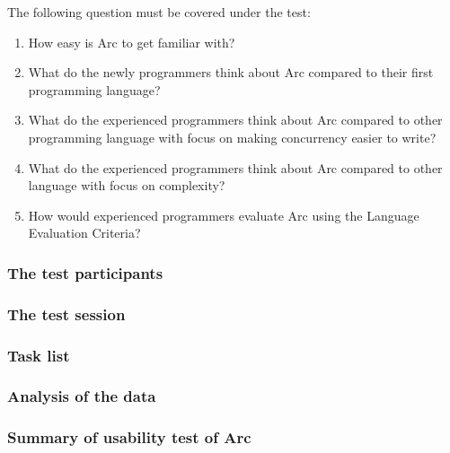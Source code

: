 The following question must be covered under the test:
\begin{enumerate}
    \item How easy is Arc to get familiar with?
    \item What do the newly programmers think about Arc compared to their first programming language?
    \item What do the experienced programmers think about Arc compared to other programming language with focus on making concurrency easier to write?
    \item What do the experienced programmers think about Arc compared to other language with focus on complexity?
    \item How would experienced programmers evaluate Arc using the Language Evaluation Criteria?
\end{enumerate}

\subsubsection{The test participants}\label{subsubsec:theTestParticipants}
\subsubsection{The test session}\label{subsubsec:theTestSession}
\subsubsection{Task list}\label{subsubsec:taskList}
\subsubsection{Analysis of the data}\label{subsubsec:analysisOfTheData}
    
\subsubsection{Summary of usability test of Arc}




